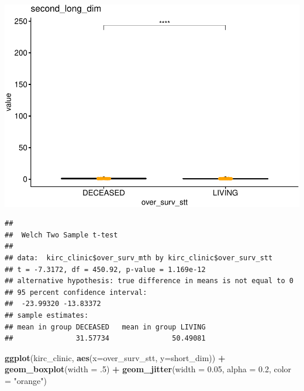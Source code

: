 \documentclass[]{article}
\newenvironment{Shaded}{\begin{snugshade}}{\end{snugshade}}
\newcommand{\KeywordTok}[1]{\textcolor[rgb]{0.13,0.29,0.53}{\textbf{#1}}}
\newcommand{\DataTypeTok}[1]{\textcolor[rgb]{0.13,0.29,0.53}{#1}}
\newcommand{\DecValTok}[1]{\textcolor[rgb]{0.00,0.00,0.81}{#1}}
\newcommand{\FloatTok}[1]{\textcolor[rgb]{0.00,0.00,0.81}{#1}}
\newcommand{\StringTok}[1]{\textcolor[rgb]{0.31,0.60,0.02}{#1}}
\newcommand{\OperatorTok}[1]{\textcolor[rgb]{0.81,0.36,0.00}{\textbf{#1}}}
\newcommand{\NormalTok}[1]{#1}
\begin{document}
\includegraphics{figs/render-unnamed-chunk-12-7.pdf}

\begin{Shaded}
\end{Shaded}

\begin{verbatim}
## 
##  Welch Two Sample t-test
## 
## data:  kirc_clinic$over_surv_mth by kirc_clinic$over_surv_stt
## t = -7.3172, df = 450.92, p-value = 1.169e-12
## alternative hypothesis: true difference in means is not equal to 0
## 95 percent confidence interval:
##  -23.99320 -13.83372
## sample estimates:
## mean in group DECEASED   mean in group LIVING 
##               31.57734               50.49081
\end{verbatim}

\begin{Shaded}
\begin{Highlighting}[]
\KeywordTok{ggplot}\NormalTok{(kirc_clinic, }\KeywordTok{aes}\NormalTok{(}\DataTypeTok{x=}\NormalTok{over_surv_stt, }\DataTypeTok{y=}\NormalTok{short_dim)) }\OperatorTok{+}
\StringTok{  }\KeywordTok{geom_boxplot}\NormalTok{(}\DataTypeTok{width =}\NormalTok{ .}\DecValTok{5}\NormalTok{) }\OperatorTok{+}
\StringTok{  }\KeywordTok{geom_jitter}\NormalTok{(}\DataTypeTok{width =} \FloatTok{0.05}\NormalTok{, }\DataTypeTok{alpha =} \FloatTok{0.2}\NormalTok{, }\DataTypeTok{color =} \StringTok{"orange"}\NormalTok{)}
\end{Highlighting}
\end{Shaded}
\end{document}
